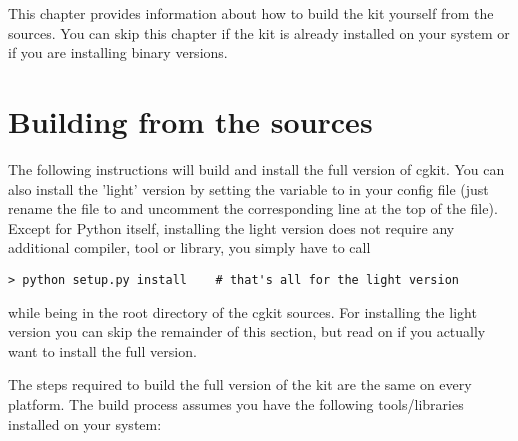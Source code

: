 
This chapter provides information about how to build the kit yourself
from the sources. You can skip this chapter if the kit is already
installed on your system or if you are installing binary versions.

\section{Building from the sources}

The following instructions will build and install the full version of cgkit.
You can also install the 'light' version by setting the variable 
 to  in your config file (just rename
the file  to  and uncomment the
corresponding line at the top of the file). Except for Python itself, 
installing the light version does not require any additional compiler, tool
or library, you simply have to call 

\begin{verbatim}
> python setup.py install    # that's all for the light version
\end{verbatim}

while being in the root directory of the cgkit sources. For installing
the light version you can skip the remainder of this section, but read
on if you actually want to install the full version.

The steps required to build the full version of the kit are the same
on every platform.  The build process assumes you have the following
tools/libraries installed on your system:

